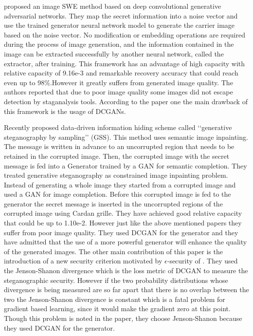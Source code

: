 \documentclass[../main/main.tex]{subfiles}
\begin{document}
	   proposed an image \gls{SWE} method based on deep convolutional generative adversarial networks. They map the secret information into a noise vector and use the trained generator neural network model to generate the carrier image based on the noise vector. No modification or embedding operations are required during the process of image generation, and the information contained in the image can be extracted successfully by another neural network, called the extractor, after training. This framework has an advantage of high capacity with relative capacity of 9.16e-3 and remarkable recovery accuracy that could reach even up to 98\%.However it greatly suffers from generated image quality. The authors reported that due to poor image quality some images did not escape detection by staganalysis tools.  According to the paper one the main drawback of this framework is the usage of \gls{DCGAN}s.
	  
	  Recently  proposed data-driven information hiding scheme called ‘‘generative steganography by sampling’’ (\gls{GSS}). This method uses semantic image inpainting. The message is written in advance to an uncorrupted region that needs to be retained in the corrupted image. Then, the corrupted image with the secret message is fed into a Generator trained by a \gls{GAN} for semantic completion. They treated generative steganography as constrained image inpainting problem. Instead of generating a whole image they started from a corrupted image and used a \gls{GAN} for image completion. Before this corrupted image is fed to the generator the secret message is inserted in the uncorrupted regions of the corrupted image using Cardan grille. They have achieved good relative capacity that could be up to 1.10e-2. However just like the above mentioned papers they suffer from poor image quality. They used \gls{DCGAN} for the generator and they have admitted that the use of a more powerful generator will enhance the quality of the generated images. The other main contribution of this paper is the introduction of a new security criterion motivated by $\epsilon$-security of . They used the Jenson-Shanon divergence which is the loss metric of \gls{DCGAN} to measure the steganographic security. However if the two probability distributions whose divergence is being measured are so far apart that there is no overlap between the two the Jenson-Shanon divergence is constant which is a fatal problem for gradient based learning, since it would make the gradient zero at this point. Though this problem is noted in the paper, they choose Jenson-Shanon because they used \gls{DCGAN} for the generator.    %
	 
\end{document}
